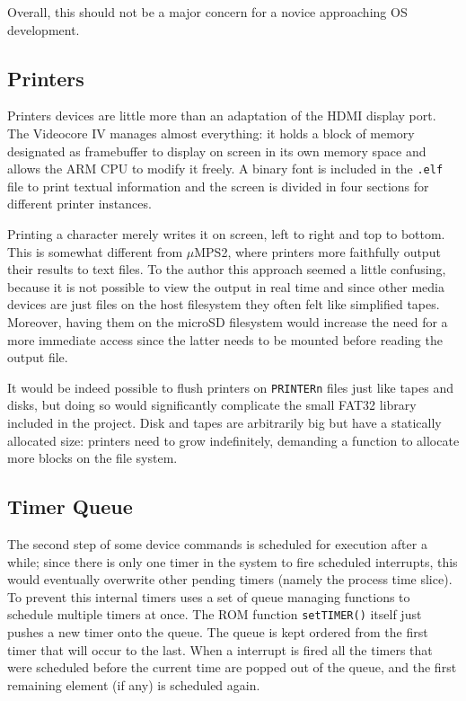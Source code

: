 \documentclass[12pt,a4paper,openright,twoside]{report}
\begin{document}
Overall, this should not be a major concern for a novice approaching OS development.

\subsection{Printers}
Printers devices are little more than an adaptation of the HDMI display port.
The Videocore IV manages almost everything: it holds a block of memory designated
as framebuffer to display on screen in its own memory space and allows the ARM
CPU to modify it freely. A binary font is included in the {\tt .elf} file to 
print textual information and the screen is divided in four sections for different
printer instances.

Printing a character merely writes it on screen, left to right and top to bottom.
This is somewhat different from $\mu$MPS2, where printers more faithfully output
their results to text files. To the author this approach seemed a little confusing,
because it is not possible to view the output in real time and since other media
devices are just files on the host filesystem they often felt like simplified 
tapes. Moreover, having them on the microSD filesystem would increase the need
for a more immediate access since the latter needs to be mounted before reading
the output file.

It would be indeed possible to flush printers on {\tt PRINTERn} files just like
tapes and disks, but doing so would significantly complicate the small FAT32 
library included in the project. Disk and tapes are arbitrarily big but have a
statically allocated size: printers need to grow indefinitely, demanding a function
to allocate more blocks on the file system.

\subsection{Timer Queue}
The second step of some device commands is scheduled for execution after a while;
since there is only one timer in the system to fire scheduled interrupts, this would
eventually overwrite other pending timers (namely the process time slice).
To prevent this internal timers uses a set of queue managing functions to 
schedule multiple timers at once. The ROM function {\tt setTIMER()} itself
just pushes a new timer onto the queue.
The queue is kept ordered from the first timer that will occur to the last.
When a interrupt is fired all the timers that were scheduled before the
current time are popped out of the queue, and the first remaining element (if any)
is scheduled again.
\end{document}

